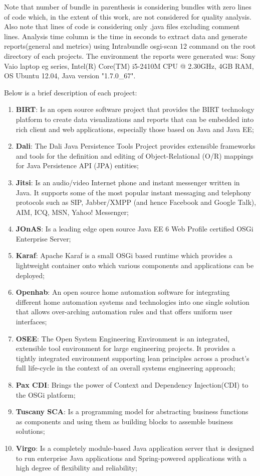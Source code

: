 Note that number of bundle in parenthesis is considering bundles with zero lines of code which, in the extent of this work, are not considered for quality analysis. Also note that lines of code is considering only .java files excluding comment lines.
Analysis time column is the time in seconds to extract data and generate reports(general and metrics) using Intrabundle osgi-scan 12 command on the root directory of each projects. The environment the reports were generated was: Sony Vaio laptop eg series, Intel(R) Core(TM) i5-2410M CPU @ 2.30GHz, 4GB RAM, OS Ubuntu 12.04, Java version "1.7.0\_67".

Below is a brief description of each project:

\begin{enumerate}
\item \textbf{BIRT}: Is an open source software project that provides the BIRT technology platform to create data visualizations and reports that can be embedded into rich client and web applications, especially those based on Java and Java EE;
\item \textbf{Dali}: The Dali Java Persistence Tools Project provides extensible frameworks and tools for the definition and editing of Object-Relational (O/R) mappings for Java Persistence API (JPA) entities;
\item \textbf{Jitsi}: Is an audio/video Internet phone and instant messenger written in Java. It supports some of the most popular instant messaging and telephony protocols such as SIP, Jabber/XMPP (and hence Facebook and Google Talk), AIM, ICQ, MSN, Yahoo! Messenger;
\item \textbf{JOnAS}: Is a leading edge open source Java EE 6 Web Profile certified OSGi Enterprise Server;
\item \textbf{Karaf}: Apache Karaf is a small OSGi based runtime which provides a lightweight container onto which various components and applications can be deployed;
\item \textbf{Openhab}: An open source home automation software for integrating different home automation systems and technologies into one single solution that allows over-arching automation rules and that offers uniform user interfaces;
\item \textbf{OSEE}: The Open System Engineering Environment is an integrated, extensible tool environment for large engineering projects. It provides a tightly integrated environment supporting lean principles across a product's full life-cycle in the context of an overall systems engineering approach;
\item \textbf{Pax CDI}: Brings the power of Context and Dependency Injection(CDI) to the OSGi platform; 
\item \textbf{Tuscany SCA}: Is a programming model for abstracting business functions as components and using them as building blocks to assemble business solutions; 
\item \textbf{Virgo}: Is a completely module-based Java application server that is designed to run enterprise Java applications and Spring-powered applications with a high degree of flexibility and reliability; 
\end{enumerate}


